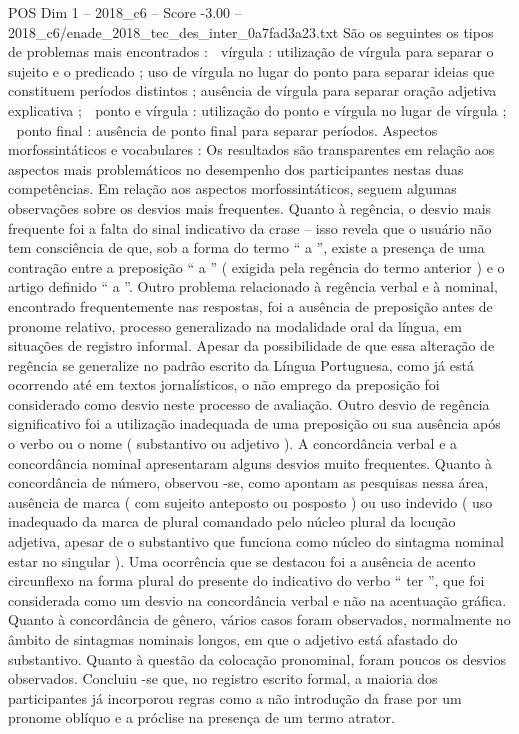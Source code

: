 \begin{textsample}{POS Dim 1 – 2018\_c6 – Score -3.00 – 2018\_c6/enade\_2018\_tec\_des\_inter\_0a7fad3a23.txt}
São os seguintes os tipos de problemas mais encontrados :  vírgula : utilização de vírgula para separar o sujeito e o predicado ; uso de vírgula no lugar do ponto para separar ideias que constituem períodos distintos ; ausência de vírgula para separar oração adjetiva explicativa ;  ponto e vírgula : utilização do ponto e vírgula no lugar de vírgula ;  ponto final : ausência de ponto final para separar períodos.
Aspectos morfossintáticos e vocabulares : Os resultados são transparentes em relação aos aspectos mais problemáticos no desempenho dos participantes nestas duas competências.
Em relação aos aspectos morfossintáticos, seguem algumas observações sobre os desvios mais frequentes.
Quanto à regência, o desvio mais frequente foi a falta do sinal indicativo da crase – isso revela que o usuário não tem consciência de que, sob a forma do termo “ a ”, existe a presença de uma contração entre a preposição “ a ” ( exigida pela regência do termo anterior ) e o artigo definido “ a ”.
Outro problema relacionado à regência verbal e à nominal, encontrado frequentemente nas respostas, foi a ausência de preposição antes de pronome relativo, processo generalizado na modalidade oral da língua, em situações de registro informal.
Apesar da possibilidade de que essa alteração de regência se generalize no padrão escrito da Língua Portuguesa, como já está ocorrendo até em textos jornalísticos, o não emprego da preposição foi considerado como desvio neste processo de avaliação.
Outro desvio de regência significativo foi a utilização inadequada de uma preposição ou sua ausência após o verbo ou o nome ( substantivo ou adjetivo ).
A concordância verbal e a concordância nominal apresentaram alguns desvios muito frequentes.
Quanto à concordância de número, observou -se, como apontam as pesquisas nessa área, ausência de marca ( com sujeito anteposto ou posposto ) ou uso indevido ( uso inadequado da marca de plural comandado pelo núcleo plural da locução adjetiva, apesar de o substantivo que funciona como núcleo do sintagma nominal estar no singular ).
Uma ocorrência que se destacou foi a ausência de acento circunflexo na forma plural do presente do indicativo do verbo “ ter ”, que foi considerada como um desvio na concordância verbal e não na acentuação gráfica.
Quanto à concordância de gênero, vários casos foram observados, normalmente no âmbito de sintagmas nominais longos, em que o adjetivo está afastado do substantivo.
Quanto à questão da colocação pronominal, foram poucos os desvios observados.
Concluiu -se que, no registro escrito formal, a maioria dos participantes já incorporou regras como a não introdução da frase por um pronome oblíquo e a próclise na presença de um termo atrator.

\end{textsample}
